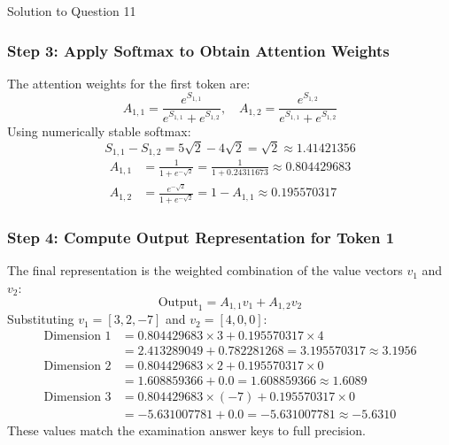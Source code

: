 \documentclass[11pt,a4paper]{article}
\begin{document}
\begin{solutionbox}{Solution to Question 11}
\subsubsection*{Step 3: Apply Softmax to Obtain Attention Weights}
The attention weights for the first token are:
\[
A_{1,1} = \frac{e^{S_{1,1}}}{e^{S_{1,1}} + e^{S_{1,2}}}, \quad A_{1,2} = \frac{e^{S_{1,2}}}{e^{S_{1,1}} + e^{S_{1,2}}}
\]
Using numerically stable softmax:
\[
S_{1,1} - S_{1,2} = 5\sqrt{2} - 4\sqrt{2} = \sqrt{2} \approx 1.41421356
\]
\begin{align*}
A_{1,1} &= \frac{1}{1 + e^{-\sqrt{2}}} = \frac{1}{1 + 0.24311673} \approx \mathbf{0.804429683} \\[0.2cm]
A_{1,2} &= \frac{e^{-\sqrt{2}}}{1 + e^{-\sqrt{2}}} = 1 - A_{1,1} \approx \mathbf{0.195570317}
\end{align*}

\subsubsection*{Step 4: Compute Output Representation for Token 1}
The final representation is the weighted combination of the value vectors $v_1$ and $v_2$:
\[
\text{Output}_1 = A_{1,1} v_1 + A_{1,2} v_2
\]
Substituting $v_1 = [3, 2, -7]$ and $v_2 = [4, 0, 0]$:
\begin{align*}
\text{Dimension 1} &= 0.804429683 \times 3 + 0.195570317 \times 4 \\
&= 2.413289049 + 0.782281268 = \mathbf{3.195570317} \approx \mathbf{3.1956} \\[0.25cm]
\text{Dimension 2} &= 0.804429683 \times 2 + 0.195570317 \times 0 \\
&= 1.608859366 + 0.0 = \mathbf{1.608859366} \approx \mathbf{1.6089} \\[0.25cm]
\text{Dimension 3} &= 0.804429683 \times (-7) + 0.195570317 \times 0 \\
&= -5.631007781 + 0.0 = \mathbf{-5.631007781} \approx \mathbf{-5.6310}
\end{align*}
These values match the examination answer keys to full precision.
\end{solutionbox}

\bigskip
\end{document}
